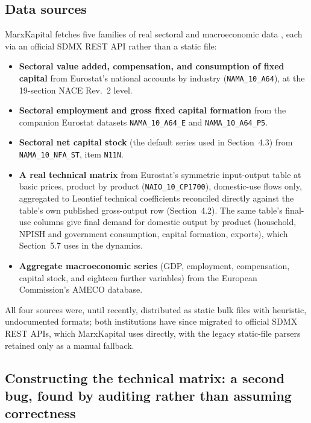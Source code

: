 \documentclass[11pt]{article}
\begin{document}
\subsection{Data sources}

MarxKapital fetches five families of real sectoral and macroeconomic data
\citep{eurostat_nama10a64,eurostat_naio10cp1700,ameco2026}, each via an
official SDMX REST API rather than a static file:

\begin{itemize}
  \item \textbf{Sectoral value added, compensation, and consumption of
    fixed capital} from Eurostat's national accounts by industry
    (\texttt{NAMA\_10\_A64}), at the 19-section NACE Rev.~2 level.
  \item \textbf{Sectoral employment and gross fixed capital formation}
    from the companion Eurostat datasets \texttt{NAMA\_10\_A64\_E} and
    \texttt{NAMA\_10\_A64\_P5}.
  \item \textbf{Sectoral net capital stock} (the default series used in
    Section~4.3) from \texttt{NAMA\_10\_NFA\_ST}, item \texttt{N11N}.
  \item \textbf{A real technical matrix} from Eurostat's symmetric
    input-output table at basic prices, product by product
    (\texttt{NAIO\_10\_CP1700}), domestic-use flows only, aggregated to
    Leontief technical coefficients reconciled directly against the
    table's own published gross-output row (Section~4.2). The same
    table's final-use columns give final demand for domestic output by
    product (household, NPISH and government consumption, capital
    formation, exports), which Section~5.7 uses in the dynamics.
  \item \textbf{Aggregate macroeconomic series} (GDP, employment,
    compensation, capital stock, and eighteen further variables) from the
    European Commission's AMECO database.
\end{itemize}

All four sources were, until recently, distributed as static bulk files
with heuristic, undocumented formats; both institutions have since
migrated to
official SDMX REST APIs, which MarxKapital uses directly, with the legacy
static-file parsers retained only as a manual fallback.

\subsection{Constructing the technical matrix: a second bug, found by auditing rather than assuming correctness}
\end{document}
